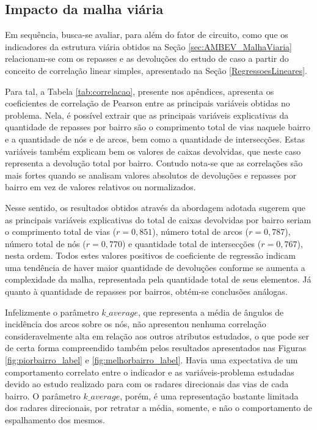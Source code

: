 \subsection{Impacto da malha viária} \label{ImpactoMalhaViariaAmbev}

Em sequência, busca-se avaliar, para além do fator de circuito, como que os indicadores da estrutura viária obtidos na Seção \ref{sec:AMBEV_MalhaViaria} relacionam-se com os repasses e as devoluções do estudo de caso a partir do conceito de correlação linear simples, apresentado na Seção \ref{RegressoesLineares}.

Para tal, a Tabela \ref{tab:correlacao}, presente nos apêndices, apresenta os coeficientes de correlação de Pearson entre as principais variáveis obtidas no problema.
Nela, é possível extrair que as principais variáveis explicativas da quantidade de repasses por bairro são o comprimento total de vias naquele bairro e a quantidade de nós e de arcos, bem como a quantidade de intersecções.
Estas variáveis também explicam bem os valores de caixas devolvidas, que neste caso representa a devolução total por bairro.
Contudo nota-se que as correlações são mais fortes quando se analisam valores absolutos de devoluções e repasses por bairro em vez de valores relativos ou normalizados.

Nesse sentido, os resultados obtidos através da abordagem adotada sugerem que as principais variáveis explicativas do total de caixas devolvidas por bairro seriam o comprimento total de vias ($r=0,851$), número total de arcos ($r=0,787$), número total de nós ($r=0,770$) e quantidade total de intersecções ($r=0,767$), nesta ordem.
Todos estes valores positivos de coeficiente de regressão indicam uma tendência de haver maior quantidade de devoluções conforme se aumenta a complexidade da malha, representada pela quantidade total de seus elementos.
Já quanto à quantidade de repasses por bairros, obtém-se conclusões análogas.

Infelizmente o parâmetro $k\_average$, que representa a média de ângulos de incidência dos arcos sobre os nós, não apresentou nenhuma correlação consideravelmente alta em relação aos outros atributos estudados, o que pode ser de certa forma compreendido também pelos resultados apresentados nas Figuras \ref{fig:piorbairro_label} e \ref{fig:melhorbairro_label}. 
Havia uma expectativa de um comportamento correlato entre o indicador e as variáveis-problema estudadas devido ao estudo realizado para com os radares direcionais das vias de cada bairro. O parâmetro $k\_average$, porém, é uma representação bastante limitada dos radares direcionais, por retratar a média, somente, e não o comportamento de espalhamento dos mesmos.